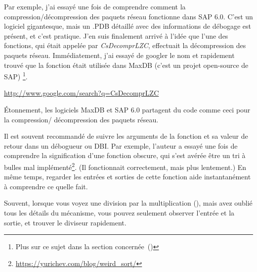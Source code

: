 
Par exemple, j'ai essayé une fois de comprendre comment la compression/décompression
des paquets réseau fonctionne dans SAP 6.0.
C'est un logiciel gigantesque, mais un .\gls{PDB} détaillé avec des informations
de débogage est présent, et c'est pratique.
J'en suis finalement arrivé à l'idée que l'une des fonctions, qui était appelée par
\emph{CsDecomprLZC}, effectuait la décompression des paquets réseau.
Immédiatement, j'ai essayé de googler le nom et rapidement trouvé que la fonction
était utilisée dans MaxDB (c'est un projet open-source de SAP)
\footnote{Plus sur ce sujet dans la section concernée~()}.

\url{http://www.google.com/search?q=CsDecomprLZC}

Étonnement, les logiciels MaxDB et SAP 6.0 partagent du code comme ceci pour la compression/
décompression des paquets réseau.



Il est souvent recommandé de suivre les arguments de la fonction et sa valeur de
retour dans un débogueur ou \ac{DBI}.
Par exemple, l'auteur a essayé une fois de comprendre la signification d'une fonction
obscure, qui s'est avérée être un tri à bulles mal implémenté\footnote{\url{https://yurichev.com/blog/weird_sort/}}.
(Il fonctionnait correctement, mais plus lentement.)
En même temps, regarder les entrées et sorties de cette fonction aide instantanément
à comprendre ce quelle fait.

Souvent, lorsque vous voyez une division par la multiplication (),
mais avez oublié tous les détails du mécanisme, vous pouvez seulement observer l'entrée
et la sortie, et trouver le diviseur rapidement.











